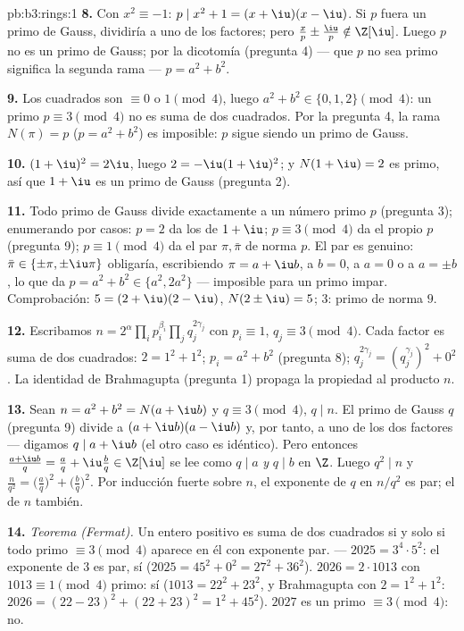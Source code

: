 \begin{solution}{pb:b3:rings:1}
\textbf{8.} Con $x^2 \equiv -1$: $p \mid x^2 + 1 = (x + \iu)(x -
\iu)$. Si $p$ fuera un primo de Gauss, dividiría a uno de los factores;
pero $\frac xp \pm \frac \iu p \notin \Z[\iu]$. Luego $p$ no es un primo
de Gauss; por la dicotomía (pregunta 4) --- que $p$ no sea primo
significa la segunda rama --- $p = a^2 + b^2$.

\textbf{9.} Los cuadrados son $\equiv 0$ o $1 \pmod 4$, luego $a^2 + b^2
\in \{0, 1, 2\} \pmod 4$: un primo $p \equiv 3 \pmod 4$ no es suma de
dos cuadrados. Por la pregunta 4, la rama $N(\pi) = p$ ($p =
a^2+b^2$) es imposible: $p$ sigue siendo un primo de Gauss.

\textbf{10.} $(1 + \iu)^2 = 2\iu$, luego $2 = -\iu(1 + \iu)^2$; y
$N(1 + \iu) = 2$ es primo, así que $1 + \iu$ es un primo de Gauss
(pregunta 2).

\textbf{11.} Todo primo de Gauss divide exactamente a un número primo
$p$ (pregunta 3); enumerando por casos: $p = 2$ da los
 de $1 + \iu$;
$p \equiv 3 \pmod 4$ da el propio $p$ (pregunta 9); $p \equiv 1 \pmod 4$
da el par $\pi, \bar\pi$ de norma $p$. El par es genuino: $\bar\pi \in
\{\pm\pi, \pm\iu\pi\}$ obligaría, escribiendo $\pi = a + \iu b$, a
$b = 0$, a $a = 0$ o a $a = \pm b$, lo que da $p = a^2 + b^2 \in
\{a^2, 2a^2\}$ --- imposible para un primo impar. Comprobación:
$5 = (2 + \iu)(2 - \iu)$, $N(2\pm\iu) = 5$; $3$: primo de norma
$9$.

\textbf{12.} Escribamos $n = 2^{\alpha}\prod_i p_i^{\beta_i} \prod_j
q_j^{2\gamma_j}$ con $p_i \equiv 1$, $q_j \equiv 3 \pmod 4$. Cada factor
es suma de dos cuadrados: $2 = 1^2 + 1^2$; $p_i = a^2
+ b^2$ (pregunta 8); $q_j^{2\gamma_j} = (q_j^{\gamma_j})^2 +
0^2$. La identidad de Brahmagupta (pregunta 1) propaga la propiedad al
producto $n$.

\textbf{13.} Sean $n = a^2 + b^2 = N(a + \iu b)$ y $q \equiv 3
\pmod 4$, $q \mid n$. El primo de Gauss $q$ (pregunta 9) divide a
$(a + \iu b)(a - \iu b)$ y, por tanto, a uno de los dos factores ---
digamos $q
\mid a + \iu b$ (el otro caso es idéntico). Pero entonces $\frac{a +
\iu b}{q} = \frac aq + \iu \frac bq \in \Z[\iu]$ se lee como $q
\mid a$ \emph{y} $q \mid b$ en $\Z$. Luego $q^2 \mid n$ y
$\frac n{q^2} =
\bigl(\frac aq\bigr)^2 + \bigl(\frac bq\bigr)^2$. Por inducción fuerte
sobre $n$, el exponente de $q$ en $n/q^2$ es par; el de $n$ también.

\textbf{14.} \emph{Teorema (Fermat).} Un entero positivo es suma de dos
cuadrados si y solo si todo primo $\equiv 3 \pmod 4$ aparece en él con
exponente par. --- $2025 = 3^4 \cdot 5^2$: el exponente de $3$ es par,
sí ($2025 = 45^2 + 0^2 = 27^2 + 36^2$). $2026 = 2 \cdot 1013$ con
$1013 \equiv 1 \pmod 4$ primo: sí ($1013 = 22^2 + 23^2$, y Brahmagupta
con $2 = 1^2+1^2$: $2026 = (22 - 23)^2 + (22 + 23)^2 = 1^2 + 45^2$).
$2027$ es un primo $\equiv 3 \pmod 4$: no.


\end{solution}
